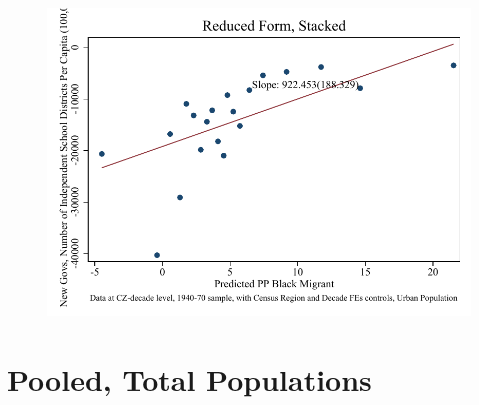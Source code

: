 \documentclass{article}
\begin{document}
\begin{figure}
\centering
\includegraphics{figures/simplefigs/stacked_schdist_ind_pc_C3_urban_rf.pdf}
\end{figure}
\clearpage



\section{Pooled, Total Populations}
\end{document}
